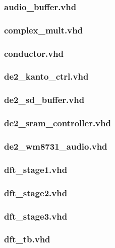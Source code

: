 \documentclass{article}
\begin{document}
	\subsubsection{audio\_buffer.vhd}
	
	\subsubsection{complex\_mult.vhd}
	
	\subsubsection{conductor.vhd}
	
	\subsubsection{de2\_kanto\_ctrl.vhd}
	
	\subsubsection{de2\_sd\_buffer.vhd}
	
	\subsubsection{de2\_sram\_controller.vhd}
	
	\subsubsection{de2\_wm8731\_audio.vhd}
	
	\subsubsection{dft\_stage1.vhd}
	
	\subsubsection{dft\_stage2.vhd}
	
	\subsubsection{dft\_stage3.vhd}
	
	\subsubsection{dft\_tb.vhd}
	
\end{document}
